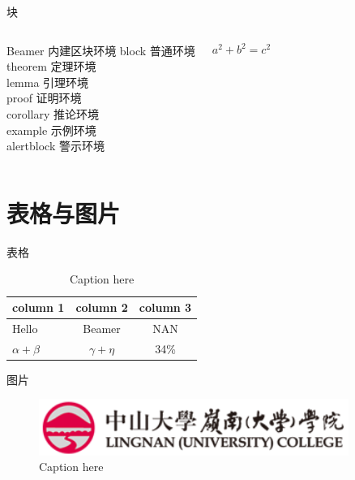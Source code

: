 \documentclass[UTF8,14pt,aspectratio=43,dvipsnames,svgnames,x11names,hyperref={urlcolor=blue}]{beamer}
\begin{document}
\begin{frame}{块}
	\begin{columns}
			\begin{block}{Beamer 内建区块环境}
				block 普通环境\\
				theorem 定理环境\\
				lemma 引理环境\\
				proof 证明环境\\
				corollary 推论环境\\
				example 示例环境\\
				alertblock 警示环境
			\end{block}
		
			\begin{theorem}[勾股定理]
				\begin{equation}  
					a^2+b^2=c^2
				\end{equation}
			\end{theorem}
	\end{columns}
\end{frame}

\section[表格与图片]{表格与图片}
\begin{frame}{表格}
	\begin{table}[htbp]  %
		\centering
		\caption{Caption here\label{tab:tablename}}
		\begin{tabular}{l|cc} \hline  
			\textbf{column 1} & \textbf{column 2} & \textbf{column 3} \\ \hline
			Hello & Beamer & NAN \\ \hline
			$\alpha+\beta$ & $\gamma+\eta$ & 34\% \\ \hline
		\end{tabular}
	\end{table}
\end{frame}

\begin{frame}{图片}
	\begin{figure}[tb]
		\centering
		\includegraphics[width=0.9\textwidth]{logo2.png}
		\caption{Caption here\label{fig:figure1}}
	\end{figure}
\end{frame}
\end{document}

